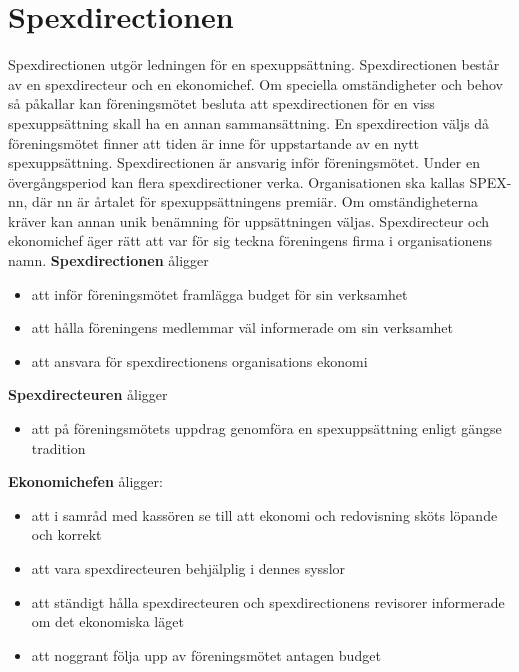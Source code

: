 \documentclass[a4paper]{article}
\begin{document}
\section{Spexdirectionen}
\label{section:spexdirectionen}
Spexdirectionen utgör ledningen för en spexuppsättning.\newline
\newline
Spexdirectionen består av en spexdirecteur och en ekonomichef.\newline
\newline
Om speciella omständigheter och behov så påkallar kan föreningsmötet besluta att spexdirectionen för en viss spexuppsättning skall ha en annan sammansättning.\newline
\newline
En spexdirection väljs då föreningsmötet finner att tiden är inne för uppstartande av en nytt spexuppsättning. Spexdirectionen är ansvarig inför föreningsmötet. Under en övergångsperiod kan flera spexdirectioner verka.\newline
\newline
Organisationen ska kallas SPEX-nn, där nn är årtalet för spexuppsättningens premiär. Om omständigheterna kräver kan annan unik benämning för uppsättningen väljas.\newline
\newline
Spexdirecteur och ekonomichef äger rätt att var för sig teckna föreningens firma i organisationens namn.\newline
\newline
\textbf{Spexdirectionen} åligger

\begin{itemize}
  \item att inför föreningsmötet framlägga budget för sin verksamhet
  \item att hålla föreningens medlemmar väl informerade om sin verksamhet
  \item att ansvara för spexdirectionens organisations ekonomi
\end{itemize}

\noindent
\textbf{Spexdirecteuren} åligger

\begin{itemize}
  \item att på föreningsmötets uppdrag genomföra en spexuppsättning enligt gängse tradition
\end{itemize}

\noindent
\textbf{Ekonomichefen} åligger:

\begin{itemize}
  \item att i samråd med kassören se till att ekonomi och redovisning sköts löpande och korrekt
  \item att vara spexdirecteuren behjälplig i dennes sysslor
  \item att ständigt hålla spexdirecteuren och spexdirectionens revisorer informerade om det ekonomiska läget
  \item att noggrant följa upp av föreningsmötet antagen budget
\end{itemize}
\end{document}
